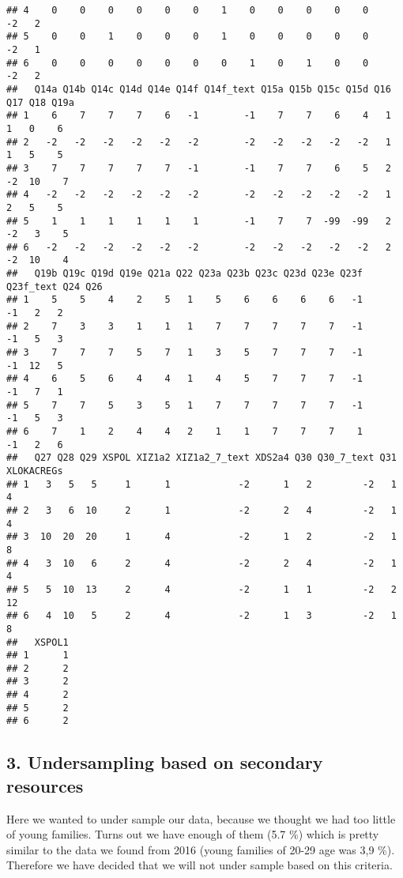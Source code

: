 \documentclass[
]{article}
\begin{document}
\begin{verbatim}
## 4    0    0    0    0    0    0    1    0    0    0    0    0        -2   2
## 5    0    0    1    0    0    0    1    0    0    0    0    0        -2   1
## 6    0    0    0    0    0    0    0    1    0    1    0    0        -2   2
##   Q14a Q14b Q14c Q14d Q14e Q14f Q14f_text Q15a Q15b Q15c Q15d Q16 Q17 Q18 Q19a
## 1    6    7    7    7    6   -1        -1    7    7    6    4   1   1   0    6
## 2   -2   -2   -2   -2   -2   -2        -2   -2   -2   -2   -2   1   1   5    5
## 3    7    7    7    7    7   -1        -1    7    7    6    5   2  -2  10    7
## 4   -2   -2   -2   -2   -2   -2        -2   -2   -2   -2   -2   1   2   5    5
## 5    1    1    1    1    1    1        -1    7    7  -99  -99   2  -2   3    5
## 6   -2   -2   -2   -2   -2   -2        -2   -2   -2   -2   -2   2  -2  10    4
##   Q19b Q19c Q19d Q19e Q21a Q22 Q23a Q23b Q23c Q23d Q23e Q23f Q23f_text Q24 Q26
## 1    5    5    4    2    5   1    5    6    6    6    6   -1        -1   2   2
## 2    7    3    3    1    1   1    7    7    7    7    7   -1        -1   5   3
## 3    7    7    7    5    7   1    3    5    7    7    7   -1        -1  12   5
## 4    6    5    6    4    4   1    4    5    7    7    7   -1        -1   7   1
## 5    7    7    5    3    5   1    7    7    7    7    7   -1        -1   5   3
## 6    7    1    2    4    4   2    1    1    7    7    7    1        -1   2   6
##   Q27 Q28 Q29 XSPOL XIZ1a2 XIZ1a2_7_text XDS2a4 Q30 Q30_7_text Q31 XLOKACREGs
## 1   3   5   5     1      1            -2      1   2         -2   1          4
## 2   3   6  10     2      1            -2      2   4         -2   1          4
## 3  10  20  20     1      4            -2      1   2         -2   1          8
## 4   3  10   6     2      4            -2      2   4         -2   1          4
## 5   5  10  13     2      4            -2      1   1         -2   2         12
## 6   4  10   5     2      4            -2      1   3         -2   1          8
##   XSPOL1
## 1      1
## 2      2
## 3      2
## 4      2
## 5      2
## 6      2
\end{verbatim}

\hypertarget{undersampling-based-on-secondary-resources}{%
\subsection{3. Undersampling based on secondary
resources}\label{undersampling-based-on-secondary-resources}}

Here we wanted to under sample our data, because we thought we had too
little of young families. Turns out we have enough of them (5.7 \%)
which is pretty similar to the data we found from 2016 (young families
of 20-29 age was 3,9 \%). Therefore we have decided that we will not
under sample based on this criteria.
\end{document}
